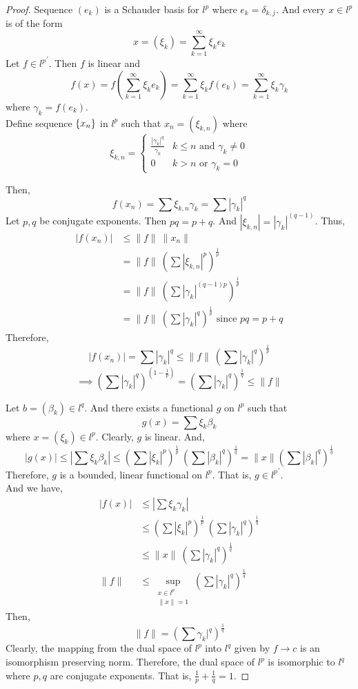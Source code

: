\begin{proof}
	Sequence $(e_k)$ is a Schauder basis for $l^p$ where $e_k = \delta_{k,j}$.
	And every $x \in l^p$ is of the form
	\[ x = (\xi_k) = \sum_{k=1}^\infty \xi_k e_k \]
	Let $f \in {l^p}^\prime$.
	Then $f$ is linear and
	\[ f(x) = f\left( \sum_{k=1}^\infty \xi_k e_k \right) = \sum_{k=1}^\infty \xi_k f(e_k) = \sum_{k=1}^\infty \xi_k \gamma_k \]
	where $\gamma_k = f(e_k)$.\\

	Define sequence $\left\{x_n\right\}$ in $l^p$ such that $ x_n = (\xi_{k,n})$ where 
	\[ \xi_{k,n} = \begin{cases} \frac{|\gamma_k|^q}{\gamma_k} & k \le n \text{ and } \gamma_k \ne 0 \\ 0 & k > n \text{ or } \gamma_k = 0 \end{cases} \]
	
	Then,
	\[ f(x_n) = \sum \xi_{k,n} \gamma_k = \sum |\gamma_k|^q \]
	Let $p,q$ be conjugate exponents.
	Then $pq = p+q$.
	And $|\xi_{k,n}| = |\gamma_k|^{(q-1)}$.
	Thus,
	\begin{align*}
		|f(x_n)|
		& \le \|f\| \ \|x_n\| \\
		& = \|f\| \ \left( \sum |\xi_{k,n}|^p \right)^\frac{1}{p} \\
		& = \|f\| \ \left( \sum |\gamma_k|^{(q-1)p} \right)^\frac{1}{p} \\
		& = \|f\| \ \left(\sum |\gamma_k|^q \right)^\frac{1}{p} \text{ since } pq = p+q
	\end{align*}
	Therefore,
	\[ |f(x_n)| = \sum |\gamma_k|^q \le \|f\| \ \left(\sum |\gamma_k|^q \right)^\frac{1}{p} \]
	\[ \implies \left( \sum |\gamma_k|^q \right)^{\left(1-\frac{1}{p}\right)}  = \left( \sum |\gamma_k|^q \right)^\frac{1}{q} \le \|f\| \]

	Let $b = (\beta_k) \in l^q$.
	And there exists a functional $g$ on $l^p$ such that
	\[ g(x) = \sum \xi_k \beta_k \]
	where $x = (\xi_k) \in l^p$.
	Clearly, $g$ is linear.
	And,
	\[ |g(x)| \le \left|\sum \xi_k \beta_k \right| \le \left( \sum |\xi_k|^p \right)^\frac{1}{p} \ \left( \sum |\beta_k|^q \right)^\frac{1}{q} = \|x\| \left( \sum |\beta_k|^q \right)^\frac{1}{q} \]
	Therefore, $g$ is a bounded, linear functional on $l^p$.
	That is, $g \in {l^p}^\prime$.\\

	And we have,
	\begin{align*}
		|f(x)| & \le \left| \sum \xi_k \gamma_k \right| \\
		& \le \left( \sum |\xi_k|^p \right)^\frac{1}{p} \ \left( \sum |\gamma_k|^q \right)^\frac{1}{q} \\
		& \le \|x\| \ \left( \sum |\gamma_k|^q \right)^\frac{1}{q} \\
		\|f\| & \le \sup_{\substack{x \in l^p\\ \|x\| = 1}} \left( \sum |\gamma_k|^q \right)^\frac{1}{q}
	\end{align*}
	Then,
	\[  \|f\| = \left( \sum \gamma_k|^q \right)^\frac{1}{q} \]
	Clearly, the mapping from the dual space of ${l^p}$ into $l^q$ given by $f \to c$ is an isomorphism preserving norm.
	Therefore, the dual space of $l^p$ is isomorphic to $l^q$ where $p,q$ are conjugate exponents. That is, $\frac{1}{p}+\frac{1}{q} = 1$.
\end{proof}

